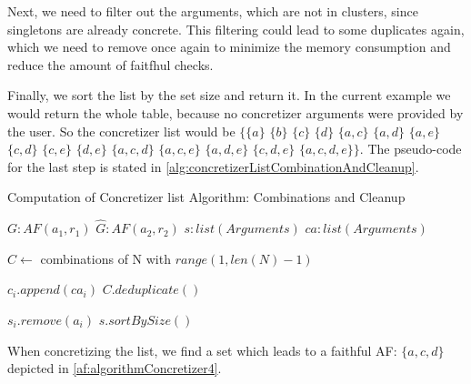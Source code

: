 Next, we need to filter out the arguments, which are not in clusters, since singletons are already concrete. This filtering could lead to some duplicates again, which we need to remove once again to minimize the memory consumption and reduce the amount of faitfhul checks.

Finally, we sort the list by the set size and return it. In the current example we would return the whole table, because no concretizer arguments were provided by the user. So the concretizer list would be
$\bigl\{\{a\}$
$\{b\}$
$\{c\}$
$\{d\}$
$\{a, c\}$
$\{a, d\}$
$\{a, e\}$
$\{c, d\}$
$\{c, e\}$
$\{d, e\}$
$\{a, c, d\}$
$\{a, c, e\}$
$\{a, d, e\}$
$\{c, d, e\}$
$\{a, c, d, e\}\bigl\}$. The pseudo-code for the last step is stated in \cref{alg:concretizerListCombinationAndCleanup}.


\begin{algorithm}
    \caption{Computation of Concretizer list Algorithm: Combinations and Cleanup}\label{alg:concretizerListCombinationAndCleanup}
    \begin{algorithmic}[1]
        \Require $G: AF(a_1, r_1)$ 
        \Require $\hat{G}: AF(a_2, r_2)$ 
        \Require $s: list(Arguments)$ 
        \Require $ca: list(Arguments)$ 

        \State $C \gets$ combinations of N with $range(1, len(N)-1)$ 

         
                \State $c_i.append(ca_i)$
            \EndFor
        \EndFor
        \State $C.deduplicate()$

         
                    \State $s_i.remove(a_i)$
                \EndIf
            \EndFor
        \EndFor
        \State \Return $s.sortBySize()$
    \end{algorithmic}
\end{algorithm}

When concretizing the list, we find a set which leads to a faithful AF: $\{a, c, d\}$ depicted in \cref{af:algorithmConcretizer4}.

